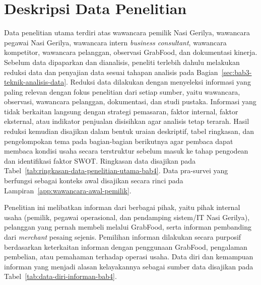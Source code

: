 \section{Deskripsi Data Penelitian}
Data penelitian utama terdiri atas wawancara pemilik Nasi Gerilya, wawancara pegawai Nasi Gerilya, wawancara intern \textit{business consultant}, wawancara kompetitor, wawancara pelanggan, observasi GrabFood, dan dokumentasi kinerja. Sebelum data dipaparkan dan dianalisis, peneliti terlebih dahulu melakukan reduksi data dan penyajian data sesuai tahapan analisis pada Bagian~\ref{sec:bab3-teknik-analisis-data}. Reduksi data dilakukan dengan menyeleksi informasi yang paling relevan dengan fokus penelitian dari setiap sumber, yaitu wawancara, observasi, wawancara pelanggan, dokumentasi, dan studi pustaka. Informasi yang tidak berkaitan langsung dengan strategi pemasaran, faktor internal, faktor eksternal, atau indikator penjualan disisihkan agar analisis tetap terarah. Hasil reduksi kemudian disajikan dalam bentuk uraian deskriptif, tabel ringkasan, dan pengelompokan tema pada bagian-bagian berikutnya agar pembaca dapat membaca kondisi usaha secara terstruktur sebelum masuk ke tahap pengodean dan identifikasi faktor SWOT. Ringkasan data disajikan pada Tabel~\ref{tab:ringkasan-data-penelitian-utama-bab4}. Data pra-survei yang berfungsi sebagai konteks awal disajikan secara rinci pada Lampiran~\ref{app:wawancara-awal-pemilik}.

Penelitian ini melibatkan informan dari berbagai pihak, yaitu pihak internal usaha (pemilik, pegawai operasional, dan pendamping sistem/IT Nasi Gerilya), pelanggan yang pernah membeli melalui GrabFood, serta informan pembanding dari \textit{merchant} pesaing sejenis. Pemilihan informan dilakukan secara purposif berdasarkan keterkaitan informan dengan penggunaan GrabFood, pengalaman pembelian, atau pemahaman terhadap operasi usaha. Data diri dan kemampuan informan yang menjadi alasan kelayakannya sebagai sumber data disajikan pada Tabel~\ref{tab:data-diri-informan-bab4}.

